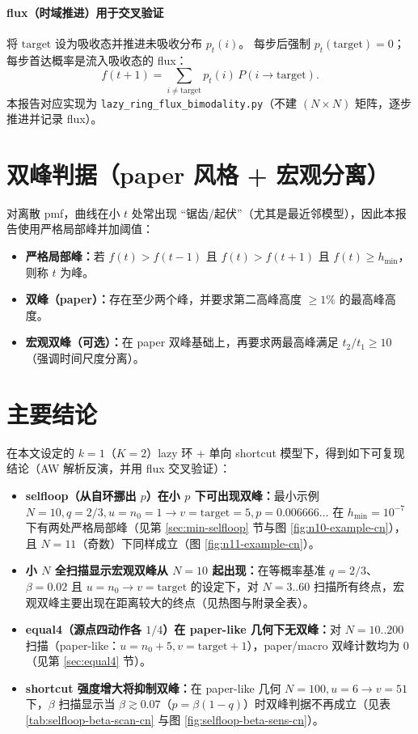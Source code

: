 \documentclass[11pt,fontset=fandol]{ctexart}
\begin{document}
\paragraph{flux（时域推进）用于交叉验证}
将 $\mathrm{target}$ 设为吸收态并推进未吸收分布 $p_t(i)$。
每步后强制 $p_t(\mathrm{target})=0$；每步首达概率是流入吸收态的 flux：
\[
f(t+1)=\sum_{i\neq \mathrm{target}} p_t(i)\,P(i\to \mathrm{target}).
\]
本报告对应实现为 \texttt{lazy\_ring\_flux\_bimodality.py}（不建 $(N\times N)$ 矩阵，逐步推进并记录 flux）。

\section{双峰判据（paper 风格 + 宏观分离）}\label{sec:criterion}
对离散 pmf，曲线在小 $t$ 处常出现 ``锯齿/起伏''（尤其是最近邻模型），因此本报告使用严格局部峰并加阈值：
\begin{itemize}
  \item \textbf{严格局部峰：}若 $f(t)>f(t-1)$ 且 $f(t)>f(t+1)$ 且 $f(t)\ge h_{\min}$，则称 $t$ 为峰。
  \item \textbf{双峰（paper）：}存在至少两个峰，并要求第二高峰高度 $\ge 1\%$ 的最高峰高度。
  \item \textbf{宏观双峰（可选）：}在 paper 双峰基础上，再要求两最高峰满足 $t_2/t_1\ge 10$（强调时间尺度分离）。
\end{itemize}

\section{主要结论}
在本文设定的 $k=1$（$K=2$）lazy 环 + 单向 shortcut 模型下，得到如下可复现结论（AW 解析反演，并用 flux 交叉验证）：
\begin{itemize}
  \item \textbf{selfloop（从自环挪出 $p$）在小 $p$ 下可出现双峰：}最小示例 $N=10,q=2/3,u=n_0=1\to v=\mathrm{target}=5,p=0.006666\ldots$ 在 $h_{\min}=10^{-7}$ 下有两处严格局部峰（见第 \ref{sec:min-selfloop} 节与图 \autoref{fig:n10-example-cn}），且 $N=11$（奇数）下同样成立（图 \autoref{fig:n11-example-cn}）。
  \item \textbf{小 $N$ 全扫描显示宏观双峰从 $N=10$ 起出现：}在等概率基准 $q=2/3$、$\beta=0.02$ 且 $u=n_0\to v=\mathrm{target}$ 的设定下，对 $N=3..60$ 扫描所有终点，宏观双峰主要出现在距离较大的终点（见热图与附录全表）。
  \item \textbf{equal4（源点四动作各 $1/4$）在 paper-like 几何下无双峰：}对 $N=10..200$ 扫描（paper-like：$u=n_0+5, v=\mathrm{target}+1$），paper/macro 双峰计数均为 0（见第 \ref{sec:equal4} 节）。
  \item \textbf{shortcut 强度增大将抑制双峰：}在 paper-like 几何 $N=100,u=6\to v=51$ 下，$\beta$ 扫描显示当 $\beta\gtrsim 0.07$（$p=\beta(1-q)$）时双峰判据不再成立（见表 \autoref{tab:selfloop-beta-scan-cn} 与图 \autoref{fig:selfloop-beta-sens-cn}）。
\end{itemize}
\end{document}
